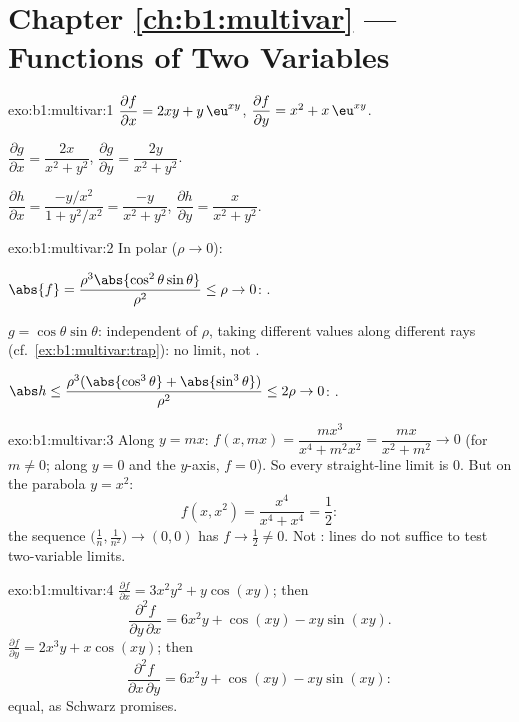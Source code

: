 \section*{Chapter \ref{ch:b1:multivar} --- Functions of Two Variables}

\begin{solution}{exo:b1:multivar:1}
$\dfrac{\partial f}{\partial x} = 2xy + y\,\eu^{xy}$,
$\dfrac{\partial f}{\partial y} = x^2 + x\,\eu^{xy}$.

$\dfrac{\partial g}{\partial x} = \dfrac{2x}{x^2+y^2}$,
$\dfrac{\partial g}{\partial y} = \dfrac{2y}{x^2+y^2}$.

$\dfrac{\partial h}{\partial x} = \dfrac{-y/x^2}{1 + y^2/x^2} =
\dfrac{-y}{x^2+y^2}$,
$\dfrac{\partial h}{\partial y} = \dfrac{x}{x^2+y^2}$.
\end{solution}

\begin{solution}{exo:b1:multivar:2}
In polar  ($\rho \to 0$):

$\abs{f} = \dfrac{\rho^3\abs{\cos^2\theta\sin\theta}}{\rho^2} \leq
\rho \to 0$: .

$g = \cos\theta\sin\theta$: independent of $\rho$, taking different
values along different rays (cf.\
\cref{ex:b1:multivar:trap}): no limit, not .

$\abs h \leq \dfrac{\rho^3(\abs{\cos^3\theta} +
\abs{\sin^3\theta})}{\rho^2} \leq 2\rho \to 0$: .
\end{solution}

\begin{solution}{exo:b1:multivar:3}
Along $y = mx$: $f(x, mx) = \dfrac{m x^3}{x^4 + m^2 x^2} =
\dfrac{mx}{x^2 + m^2} \to 0$ (for $m \neq 0$; along $y = 0$ and the
$y$-axis, $f = 0$). So every straight-line limit is $0$. But on the
parabola $y = x^2$:
\[
f(x, x^2) = \frac{x^4}{x^4 + x^4} = \frac12 :
\]
the sequence $\bigl(\frac1n, \frac{1}{n^2}\bigr) \to (0,0)$ has
$f \to \frac12 \neq 0$. Not : lines do not suffice to
test two-variable limits.
\end{solution}

\begin{solution}{exo:b1:multivar:4}
$\frac{\partial f}{\partial x} = 3x^2y^2 + y\cos(xy)$; then
\[
\frac{\partial^2 f}{\partial y\,\partial x}
= 6x^2 y + \cos(xy) - xy\sin(xy) .
\]
$\frac{\partial f}{\partial y} = 2x^3 y + x\cos(xy)$; then
\[
\frac{\partial^2 f}{\partial x\,\partial y}
= 6x^2 y + \cos(xy) - xy\sin(xy) :
\]
equal, as Schwarz promises.
\end{solution}

